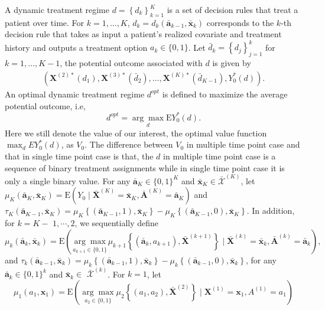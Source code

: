 \documentclass[11pt]{article}
\theoremstyle{referenceplain}
\theoremstyle{referencedefinition}
\theoremstyle{referenceremark}
\begin{document}
A dynamic treatment regime $d=\left\{d_k\right\}_{k=1}^K$ is a set of decision rules that treat a patient over time. For $k=1, \ldots, K$,  $d_k=d_k\left(\bar{\mathbf{a}}_{k-1}, \bar{\mathbf{x}}_k\right)$ corresponds to the $k$-th decision rule that takes as input a patient's realized covariate and treatment history and outputs a treatment option $a_k \in\{0,1\}$. Let $\bar{d}_k=\left\{d_j\right\}_{j=1}^k$ for $k=1, \ldots, K-1$, the potential outcome associated with $d$ is given by
\begin{align*}
    \left(\mathbf{X}^{(2) *}\left(d_1\right), \mathbf{X}^{(3) *}\left(\bar{d}_2\right), \ldots, \mathbf{X}^{(K) *}\left(\bar{d}_{K-1}\right), Y_0^*(d)\right).
\end{align*}
An optimal dynamic treatment regime $d^{o p t}$ is defined to maximize the average potential outcome, i.e,
$$
d^{o p t}=\underset{d}{\arg \max } \mathrm{E} Y_0^*(d).
$$
Here we still denote the value of our interest, the optimal value function $\max_d E Y_0^*(d)$, as $V_0$. The difference between $V_0$ in multiple time point case and that in single time point case is that, the $d$ in multiple time point case is a sequence of binary treatment assignments while in single time point case it is only a single binary value. For any $\bar{\mathbf{a}}_K \in\{0,1\}^K$ and $\bar{\mathbf{x}}_K \in \bar{\mathcal{X}}^{(K)}$, let $\mu_K\left(\bar{\mathbf{a}}_K, \bar{\mathbf{x}}_K\right)=\mathrm{E}\left(Y_0 \mid \bar{\mathbf{X}}^{(K)}=\bar{\mathbf{x}}_K, \bar{\mathbf{A}}^{(K)}=\bar{\mathbf{a}}_K\right)$ and $\tau_K\left(\bar{\mathbf{a}}_{K-1}, \bar{\mathbf{x}}_K\right)=\mu_K\left\{\left(\bar{\mathbf{a}}_{K-1}, 1\right), \bar{\mathbf{x}}_K\right\}-\mu_K\left\{\left(\bar{\mathbf{a}}_{K-1}, 0\right), \bar{\mathbf{x}}_K\right\}$. In addition, for $k=K-$ $1, \cdots, 2$, we sequentially define
$$
\mu_k\left(\bar{\mathbf{a}}_k, \bar{\mathbf{x}}_k\right)=\mathrm{E}\left(\underset{a_{k+1} \in\{0,1\}}{\arg \max }  \mu_{k+1}\left\{\left(\bar{\mathbf{a}}_k, a_{k+1}\right), \bar{\mathbf{X}}^{(k+1)}\right\} \mid \bar{\mathbf{X}}^{(k)}=\bar{\mathbf{x}}_k, \bar{\mathbf{A}}^{(k)}=\bar{\mathbf{a}}_k\right),
$$
and $\tau_k\left(\bar{\mathbf{a}}_{k-1}, \bar{\mathbf{x}}_k\right)=\mu_k\left\{\left(\bar{\mathbf{a}}_{k-1}, 1\right), \bar{\mathbf{x}}_k\right\}-\mu_k\left\{\left(\bar{\mathbf{a}}_{k-1}, 0\right), \bar{\mathbf{x}}_k\right\}$, for any $\bar{\mathbf{a}}_k \in\{0,1\}^k$ and $\bar{\mathbf{x}}_k \in$ $\bar{\mathcal{X}}^{(k)}$. For $k=1$, let
$$
\mu_1\left(a_1, \mathbf{x}_1\right)=\mathrm{E}\left(\underset{a_2 \in\{0,1\}}{\arg \max }  \mu_2\left\{\left(a_1, a_2\right), \bar{\mathbf{X}}^{(2)}\right\} \mid \mathbf{X}^{(1)}=\mathbf{x}_1, A^{(1)}=a_1\right)
$$
\end{document}
